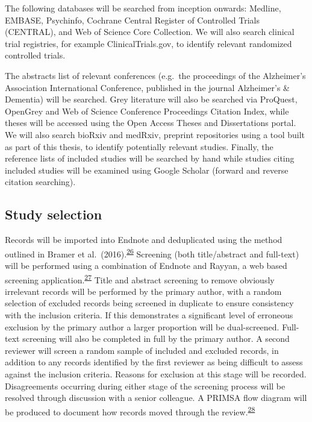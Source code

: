 \documentclass[a4paper, twoside]{templates/ociamthesis}
\begin{document}
The following databases will be searched from inception onwards: Medline, EMBASE, Psychinfo, Cochrane Central Register of Controlled Trials (CENTRAL), and Web of Science Core Collection. We will also search clinical trial registries, for example ClinicalTrials.gov, to identify relevant randomized controlled trials.

The abstracts list of relevant conferences (e.g.~the proceedings of the Alzheimer's Association International Conference, published in the journal Alzheimer's \& Dementia) will be searched. Grey literature will also be searched via ProQuest, OpenGrey and Web of Science Conference Proceedings Citation Index, while theses will be accessed using the Open Access Theses and Dissertations portal. We will also search bioRxiv and medRxiv, preprint repositories using a tool built as part of this thesis, to identify potentially relevant studies. Finally, the reference lists of included studies will be searched by hand while studies citing included studies will be examined using Google Scholar (forward and reverse citation searching).

\hypertarget{study-selection}{%
\subsection{Study selection}\label{study-selection}}

Records will be imported into Endnote and deduplicated using the method outlined in Bramer et al.~(2016).\textsuperscript{\protect\hyperlink{ref-bramer2016}{26}} Screening (both title/abstract and full-text) will be performed using a combination of Endnote and Rayyan, a web based screening application.\textsuperscript{\protect\hyperlink{ref-ouzzani2016}{27}}
Title and abstract screening to remove obviously irrelevant records will be performed by the primary author, with a random selection of excluded records being screened in duplicate to ensure consistency with the inclusion criteria. If this demonstrates a significant level of erroneous exclusion by the primary author a larger proportion will be dual-screened.
Full-text screening will also be completed in full by the primary author. A second reviewer will screen a random sample of included and excluded records, in addition to any records identified by the first reviewer as being difficult to assess against the inclusion criteria. Reasons for exclusion at this stage will be recorded. Disagreements occurring during either stage of the screening process will be resolved through discussion with a senior colleague. A PRIMSA flow diagram will be produced to document how records moved through the review.\textsuperscript{\protect\hyperlink{ref-zotero-766}{28}}
\end{document}
